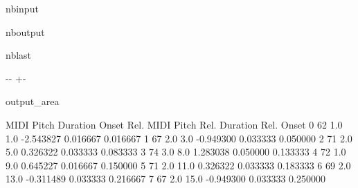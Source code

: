\documentclass[letterpaper,10pt,english]{sphinxmanual}
\newlength\nbsphinxcodecellspacing
\begin{document}
\begin{sphinxuseclass}{nbinput}
{
\begin{sphinxVerbatim}[commandchars=\\\{\}]
\llap{\color{nbsphinxin}[29]:\,\hspace{\fboxrule}\hspace{\fboxsep}}\PYG{p}{[}\PYG{p}{]}
\end{sphinxVerbatim}
}

\end{sphinxuseclass}
\begin{sphinxuseclass}{nboutput}
\begin{sphinxuseclass}{nblast}
{

\kern-\sphinxverbatimsmallskipamount\kern-\baselineskip
\kern+\FrameHeightAdjust\kern-\fboxrule
\vspace{\nbsphinxcodecellspacing}

\begin{sphinxuseclass}{output_area}
\begin{sphinxuseclass}{}


\begin{sphinxVerbatim}[commandchars=\\\{\}]
\llap{\color{nbsphinxout}[29]:\,\hspace{\fboxrule}\hspace{\fboxsep}}   MIDI Pitch  Duration  Onset  Rel. MIDI Pitch  Rel. Duration  Rel. Onset
0          62       1.0    1.0        -2.543827       0.016667    0.016667
1          67       2.0    3.0        -0.949300       0.033333    0.050000
2          71       2.0    5.0         0.326322       0.033333    0.083333
3          74       3.0    8.0         1.283038       0.050000    0.133333
4          72       1.0    9.0         0.645227       0.016667    0.150000
5          71       2.0   11.0         0.326322       0.033333    0.183333
6          69       2.0   13.0        -0.311489       0.033333    0.216667
7          67       2.0   15.0        -0.949300       0.033333    0.250000
\end{sphinxVerbatim}



\end{sphinxuseclass}
\end{sphinxuseclass}
}

\end{sphinxuseclass}
\end{sphinxuseclass}
\end{document}
